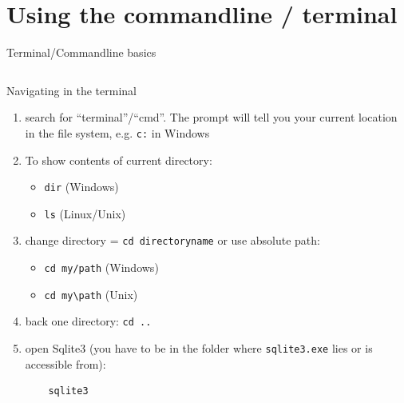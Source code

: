 \section{Using the commandline / terminal}
\begin{frame}{Terminal/Commandline basics}
\footnotesize
{}

\begin{columns}

\begin{block}{Navigating in the terminal}
\begin{enumerate}
    \item search for ``terminal''/``cmd''. The prompt will tell you your current location in the file system, e.g. \texttt{c:} in Windows 
\item To show contents of current directory:
\begin{itemize}\scriptsize
    \item \texttt{dir} (Windows)
    \item \texttt{ls} (Linux/Unix)
\end{itemize}
\item change directory = \texttt{cd directoryname} or use absolute path:
\begin{itemize}\scriptsize
    \item \texttt{cd my/path} (Windows)
    \item \verb|cd my\path| (Unix)
\end{itemize} 
\item back one directory: \texttt{cd ..}
\item open Sqlite3 (you have to be in the folder where \texttt{sqlite3.exe} lies or is accessible from): 
\begin{verbatim}
    sqlite3
\end{verbatim}
\end{enumerate}
\end{block}



\end{columns}
\end{frame}
